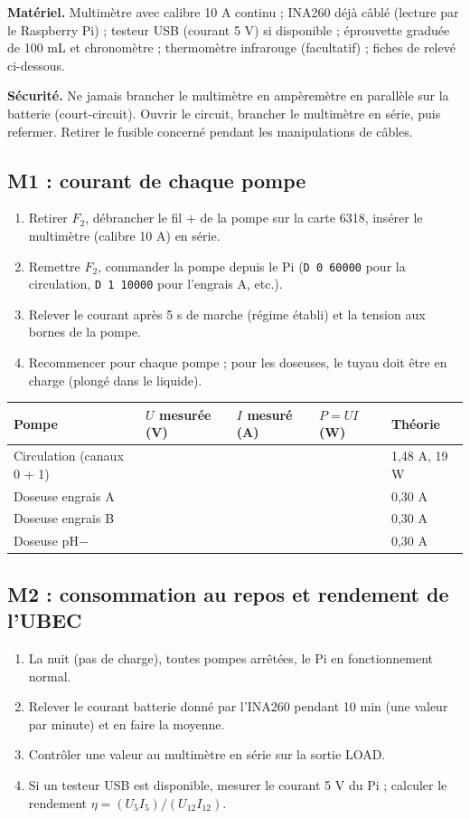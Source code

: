 \documentclass[11pt,a4paper]{article}
\begin{document}
\textbf{Matériel.} Multimètre avec calibre 10 A continu ; INA260 déjà câblé (lecture par le Raspberry Pi) ; testeur USB (courant 5 V) si disponible ; éprouvette graduée de 100 mL et chronomètre ; thermomètre infrarouge (facultatif) ; fiches de relevé ci-dessous.

\textbf{Sécurité.} Ne jamais brancher le multimètre en ampèremètre en parallèle sur la batterie (court-circuit). Ouvrir le circuit, brancher le multimètre en série, puis refermer. Retirer le fusible concerné pendant les manipulations de câbles.

\subsection{M1 : courant de chaque pompe}
\begin{enumerate}[nosep]
\item Retirer $F_2$, débrancher le fil $+$ de la pompe sur la carte 6318, insérer le multimètre (calibre 10 A) en série.
\item Remettre $F_2$, commander la pompe depuis le Pi (\texttt{D 0 60000} pour la circulation, \texttt{D 1 10000} pour l'engrais A, etc.).
\item Relever le courant après 5 s de marche (régime établi) et la tension aux bornes de la pompe.
\item Recommencer pour chaque pompe ; pour les doseuses, le tuyau doit être en charge (plongé dans le liquide).
\end{enumerate}

\begin{center}
\begin{tabular}{|p{4.2cm}|p{2.2cm}|p{2.2cm}|p{2.2cm}|p{2.8cm}|}
\hline
\textbf{Pompe} & \textbf{$U$ mesurée (V)} & \textbf{$I$ mesuré (A)} & \textbf{$P = UI$ (W)} & \textbf{Théorie} \\
\hline
Circulation (canaux 0 + 1) & & & & 1,48 A, 19 W \\[6pt]\hline
Doseuse engrais A & & & & 0,30 A \\[6pt]\hline
Doseuse engrais B & & & & 0,30 A \\[6pt]\hline
Doseuse pH$-$ & & & & 0,30 A \\[6pt]\hline
\end{tabular}
\end{center}

\subsection{M2 : consommation au repos et rendement de l'UBEC}
\begin{enumerate}[nosep]
\item La nuit (pas de charge), toutes pompes arrêtées, le Pi en fonctionnement normal.
\item Relever le courant batterie donné par l'INA260 pendant 10 min (une valeur par minute) et en faire la moyenne.
\item Contrôler une valeur au multimètre en série sur la sortie LOAD.
\item Si un testeur USB est disponible, mesurer le courant 5 V du Pi ; calculer le rendement $\eta = (U_5 I_5)/(U_{12} I_{12})$.
\end{enumerate}
\end{document}
